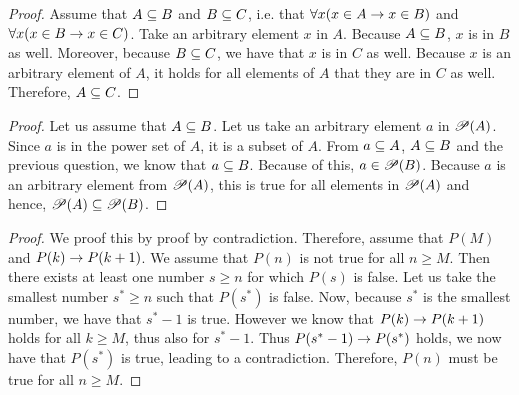 \begin{solutions}
	\solution
	\begin{proof}
		Assume that $A\subseteq B$ and $B\subseteq C$, i.e. that $\forall x(x\in A\rightarrow x\in B)$ and $\forall x(x\in B\rightarrow x\in C)$. Take an arbitrary element $x$ in $A$. Because $A\subseteq B$, $x$ is in $B$ as well. Moreover, because $B\subseteq C$, we have that $x$ is in $C$ as well. Because $x$ is an arbitrary element of $A$, it holds for all elements of $A$ that they are in $C$ as well. Therefore, $A\subseteq C$.
	\end{proof}

	\solution
	\begin{proof}
		Let us assume that $A\subseteq B$. Let us take an arbitrary element $a$ in ${\mathscr P}(A)$. Since $a$ is in the power set of $A$, it is a subset of $A$. From $a\subseteq A$, $A\subseteq B$ and the previous question, we know that $a\subseteq B$. Because of this, $a\in{\mathscr P}(B)$. Because $a$ is an arbitrary element from ${\mathscr P}(A)$, this is true for all elements in ${\mathscr P}(A)$ and hence, ${\mathscr P}(A)\subseteq{\mathscr P}(B)$.
	\end{proof}

	\solution
	\begin{proof}
		We proof this by proof by contradiction. Therefore, assume that $P(M)$ and $P(k)\rightarrow P(k+1)$. We assume that $P(n)$ is not true for all $n\geq M$. Then there exists at least one number $s\geq n$ for which $P(s)$ is false. Let us take the smallest number $s^*\geq n$ such that $P(s^*)$ is false. Now, because $s^*$ is the smallest number, we have that $s^*-1$ is true. However we know that $P(k)\rightarrow P(k+1)$ holds for all $k\geq M$, thus also for $s^*-1$. Thus $P(s^*-1)\rightarrow P(s^*)$ holds, we now have that $P(s^*)$ is true, leading to a contradiction. Therefore, $P(n)$ must be true for all $n\geq M$.
	\end{proof}


\end{solutions}
